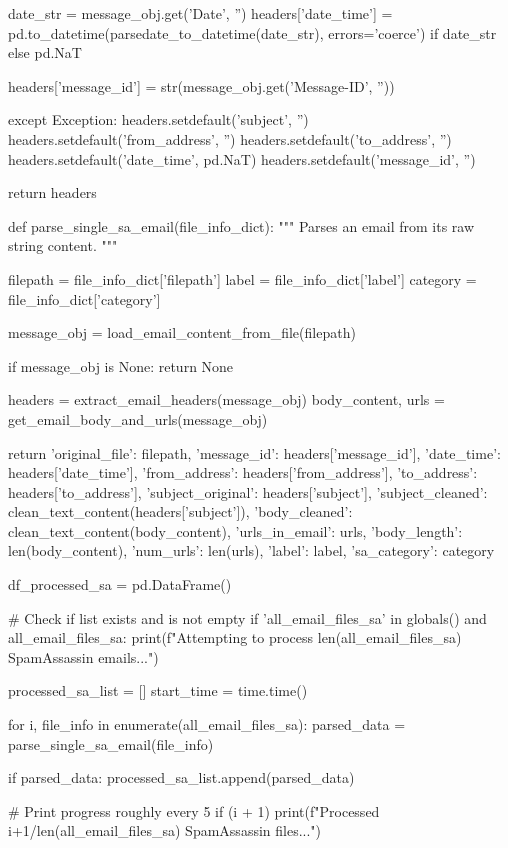 \begin{ffcode}
    date_str = message_obj.get('Date', '')
    headers['date_time'] = pd.to_datetime(parsedate_to_datetime(date_str), errors='coerce') if date_str else pd.NaT

    headers['message_id'] = str(message_obj.get('Message-ID', ''))

except Exception:
    headers.setdefault('subject', '')
    headers.setdefault('from_address', '')
    headers.setdefault('to_address', '')
    headers.setdefault('date_time', pd.NaT)
    headers.setdefault('message_id', '')

return headers
    
def parse_single_sa_email(file_info_dict):
"""
Parses an email from its raw string content.
"""

filepath = file_info_dict['filepath']
label = file_info_dict['label']
category = file_info_dict['category']

message_obj = load_email_content_from_file(filepath)

if message_obj is None:
    return None

headers = extract_email_headers(message_obj)
body_content, urls = get_email_body_and_urls(message_obj)

return {
    'original_file': filepath,
    'message_id': headers['message_id'],
    'date_time': headers['date_time'],
    'from_address': headers['from_address'],
    'to_address': headers['to_address'],
    'subject_original': headers['subject'],
    'subject_cleaned': clean_text_content(headers['subject']),
    'body_cleaned': clean_text_content(body_content),
    'urls_in_email': urls,
    'body_length': len(body_content),
    'num_urls': len(urls),
    'label': label,
    'sa_category': category
}

df_processed_sa = pd.DataFrame()

# Check if list exists and is not empty
if 'all_email_files_sa' in globals() and all_email_files_sa:
    print(f"Attempting to process {len(all_email_files_sa)} SpamAssassin emails...")

    processed_sa_list = []
    start_time = time.time()

    for i, file_info in enumerate(all_email_files_sa):
        parsed_data = parse_single_sa_email(file_info)

        if parsed_data:
            processed_sa_list.append(parsed_data)

        # Print progress roughly every 5%
        if (i + 1) %
             print(f"Processed {i+1}/{len(all_email_files_sa)} SpamAssassin files...")


\end{ffcode}
